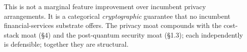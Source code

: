 This is not a marginal feature improvement over incumbent privacy
arrangements. It is a categorical \emph{cryptographic} guarantee that no
incumbent financial-services substrate offers. The privacy moat
compounds with the cost-stack moat (\S 4) and the post-quantum security
moat (\S 1.3); each independently is defensible; together they are
structural.
